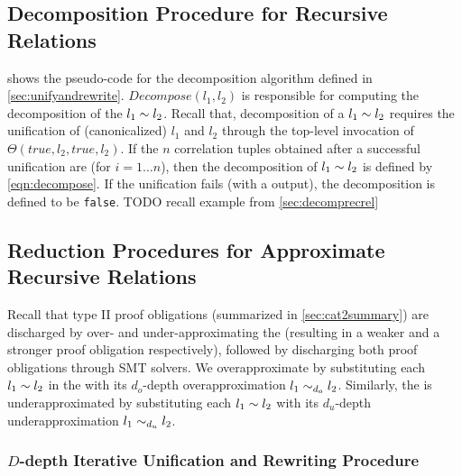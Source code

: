 \subsection{Decomposition Procedure for Recursive Relations}
\label{sec:decomposealgo}



 shows the pseudo-code for the decomposition algorithm defined in \cref{sec:unifyandrewrite}.
$Decompose(l_1, l_2)$ is responsible for computing the decomposition of the \recursiveRelation{} $l_1 \sim{} l_2$.
Recall that, decomposition of a \recursiveRelation{} $l_1 \sim{} l_2$ requires the unification of (canonicalized)
$l_1$ and $l_2$ through the top-level invocation of $\Theta(true,l_2,true,l_2)$.
If the $n$ correlation tuples obtained after a successful unification are 
(for $i=1\ldots n$), then the decomposition of $l_1 \sim{} l_2$ is defined by \cref{eqn:decompose}.
If the unification fails (with a  output), the decomposition is defined to be {\tt false}.
TODO recall example from \cref{sec:decomprecrel}

\subsection{Reduction Procedures for Approximate Recursive Relations}
\label{sec:approxalgo}
Recall that type II proof obligations (summarized in \cref{sec:cat2summary}) are discharged
by over- and under-approximating the \lhs{} (resulting in a weaker and a stronger proof obligation respectively),
followed by discharging both proof obligations through SMT solvers.
We overapproximate \lhs{} by substituting each \recursiveRelation{} $l_1 \sim{} l_2$ in the \lhs{}
with its $d_o$-depth overapproximation $l_1 \sim_{d_o} l_2$.
Similarly, the \lhs{} is underapproximated by substituting each \recursiveRelation{} $l_1 \sim{} l_2$
with its $d_u$-depth underapproximation $l_1 \sim_{d_u} l_2$.

\subsubsection{$D$-depth Iterative Unification and Rewriting Procedure}
\label{sec:dunifyandrewritealgo}




